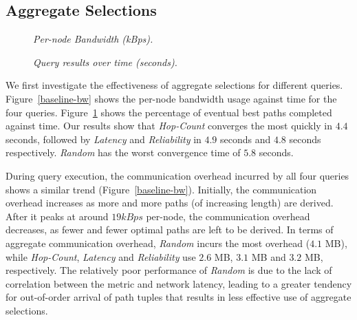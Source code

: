 \subsection{Aggregate Selections}
\label{subsec:expr:aggsel}


\begin{figure}[ht]
\centering
 \begin{minipage}{.45\linewidth}
  \begin{center}
    \small{\caption{\label{baseline-bw}\emph{\small Per-node Bandwidth (kBps).}}}
    \end{center}
 \end{minipage}
\hfill
 \begin{minipage}{.45\linewidth}
  \begin{center}
    \small{\caption{\label{baseline-convergence}\emph{\small
    Query results over time (seconds).}}}
  \end{center}
 \end{minipage}
\end{figure}

We first investigate the effectiveness of aggregate selections for
different queries. Figure~\ref{baseline-bw} shows the per-node
bandwidth usage against time for the four
queries. Figure~\ref{baseline-convergence} shows the percentage of
eventual best paths completed against time. Our results show that {\em
Hop-Count} converges the most quickly in $4.4$ seconds, followed by
{\em Latency} and {\em Reliability} in $4.9$ seconds and $4.8$ seconds
respectively. {\em Random} has the worst convergence time
of $5.8$ seconds.

During query execution, the communication overhead incurred by all
four queries shows a similar trend
(Figure~\ref{baseline-bw}). Initially, the communication overhead
increases as more and more paths (of increasing length) are derived. After
it peaks at around $19 kBps$ per-node, the communication overhead
decreases, as fewer and fewer optimal paths are left to be derived. In
terms of aggregate communication overhead, {\em Random} incurs the
most overhead ($4.1$ MB), while {\em Hop-Count}, {\em Latency} and
{\em Reliability} use $2.6$ MB, $3.1$ MB and $3.2$ MB,
respectively. The relatively poor performance of {\em Random} is due
to the lack of correlation between the metric and network latency,
leading to a greater tendency for out-of-order arrival of path tuples
that results in less effective use of aggregate selections.


